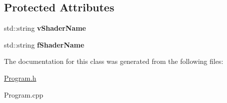 \subsection*{Protected Attributes}
\begin{DoxyCompactItemize}
\item 
\hypertarget{class_program_a9480017b0dc2594a3a175a0d1cee53fb}{}std\+::string {\bfseries v\+Shader\+Name}\label{class_program_a9480017b0dc2594a3a175a0d1cee53fb}

\item 
\hypertarget{class_program_a7af27b281e3c566c3fec82829c81a0fa}{}std\+::string {\bfseries f\+Shader\+Name}\label{class_program_a7af27b281e3c566c3fec82829c81a0fa}

\end{DoxyCompactItemize}


The documentation for this class was generated from the following files\+:\begin{DoxyCompactItemize}
\item 
\hyperlink{_program_8h}{Program.\+h}\item 
Program.\+cpp\end{DoxyCompactItemize}
